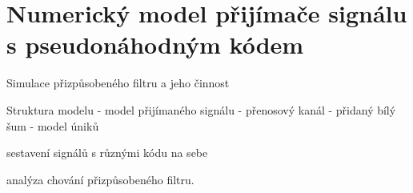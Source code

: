 \section{Numerický model přijímače signálu s pseudonáhodným kódem}

Simulace přizpůsobeného filtru a jeho činnost


Struktura modelu - model přijímaného signálu - přenosový kanál - přidaný bílý šum - model úniků

sestavení signálů s různými kódu na sebe

analýza chování přizpůsobeného filtru.

